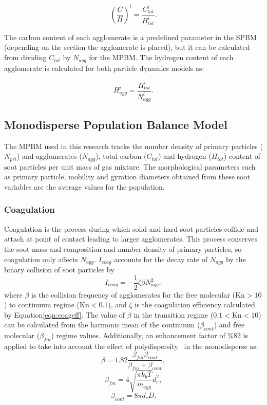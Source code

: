 \begin{equation}
	\left(
		\frac{C}{H}
	\right)^i
	=\frac{C^i_{tot}}{H^i_{tot}}   
	\label{eqn:CtoH}.
\end{equation}

The carbon content of each agglomerate is a predefined parameter in the SPBM (depending on the section the agglomerate is placed), but it can be calculated from dividing ${C_{tot}}$ by ${N_{agg}}$ for the MPBM. The hydrogen content of each agglomerate is calculated for both particle dynamics models as:

\begin{equation}
	H^i_{agg}
	=\frac{H^i_{tot}}{N^i_{agg}}   
	\label{eqn:Hagg}.
\end{equation}


\subsection{Monodisperse Population Balance Model}
The MPBM used in this research tracks the number density of primary particles ($N_{pri}$) and agglomerates ($N_{agg}$), total carbon ($C_{tot}$) and hydrogen ($H_{tot}$) content of soot particles per unit mass of gas mixture. The morphological parameters such as primary particle, mobility and gyration diameters obtained from these soot variables are the average values for the population.

\subsubsection{Coagulation}
\label{sec:monocoag}
Coagulation is the process during which solid and hard soot particles collide and attach at point of contact leading to larger agglomerates. This process conserves the soot mass and composition and number density of primary particles, so coagulation only affects ${N_{agg}}$. ${I_{coag}}$ accounts for the decay rate of ${N_{agg}}$ by the binary collision of soot particles by
\begin{equation}
	I_{coag} = -\frac{1}{2}\zeta\beta N^2_{agg}
	\label{eqn:Icoag},
\end{equation}
where ${\beta}$ is the collision frequency of agglomerates for the free molecular ($\mathrm{Kn>10}$) to continuum regime ($\mathrm{Kn<0.1}$), and $\zeta$ is the coagulation efficiency calculated by Equation\ref{eqn:coageff}. The value of ${\beta}$ in the transition regime ($\mathrm{0.1<Kn<10}$) can be calculated from the harmonic mean of the continuum (${\beta_{cont}}$) and free molecular (${\beta_{fm}}$) regime values. Additionally, an enhancement factor of \%82 is applied to take into account the effect of polydispersity~\citep{kelesidis2021self} in the monodisperse as:
\begin{equation}
	\beta = 1.82\frac{\beta_{fm}\beta_{cont}}{\beta_{fm}+\beta_{cont}}
	\label{eqn:betahmmono},
\end{equation}
\begin{equation}
	\beta_{fm} = 4\sqrt{\frac{\pi k_b T}{m_{agg}}} d^2_c
	\label{eqn:betafmmono},
\end{equation}
\begin{equation}
	\beta_{cont} = 8\pi d_c D
	\label{eqn:betacontmono}.
\end{equation}

